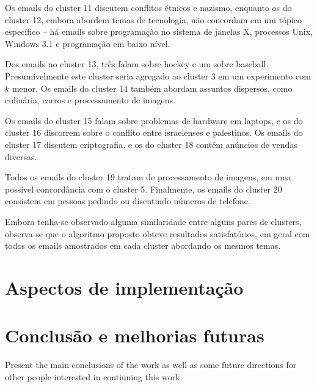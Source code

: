 \documentclass[10pt,twocolumn,letterpaper]{article}
\begin{document}
Os emails do cluster 11 discutem conflitos étnicos e nazismo, enquanto os do cluster 12, embora abordem temas de tecnologia, não concordam em um tópico específico -- há emails sobre programação no sistema de janelas X, processos Unix, Windows 3.1 e programação em baixo nível.

Dos emails no cluster 13, três falam sobre hockey e um sobre baseball. Presumivelmente este cluster seria agregado ao cluster 3 em um experimento com $k$ menor.  Os emails do cluster 14 também abordam assuntos dispersos, como culinária, carros e processamento de imagens.

Os emails do cluster 15 falam sobre problemas de hardware em laptops, e os do cluster 16 discorrem sobre o conflito entre israelenses e palestinos. Os emails do cluster 17 discutem criptografia, e os do cluster 18 contém anúncios de vendas diversas.

Todos os emails do cluster 19 tratam de processamento de imagens, em uma possível concordância com o cluster 5. Finalmente, os emails do cluster 20 consistem em pessoas pedindo ou discutindo números de telefone.

Embora tenha-se observado alguma similaridade entre alguns pares de clusters, observa-se que o algoritmo proposto obteve resultados satisfatórios, em geral com todos os emails amostrados em cada cluster abordando os mesmos temas.

\section{Aspectos de implementação}
\label{sec-impl}

\section{Conclusão e melhorias futuras}
Present the main conclusions of the work as well as some future directions for other people interested in continuing this work. 

{\small


}
\end{document}
